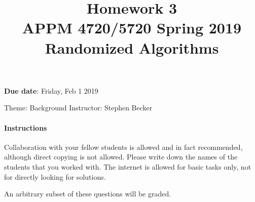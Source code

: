 \documentclass[10pt, letterpaper]{scrartcl}
\title{Homework 3 \solTitle{Selected Solutions} \\APPM 4720/5720 Spring 2019 \\ Randomized Algorithms}
\date{}
\newenvironment{instructions}{}{}
\begin{document}
\maketitle
\vspace{-6em}
\textbf{Due date}: Friday, Feb 1 2019

Theme: Background   \hfill Instructor: Stephen Becker %

\begin{instructions}
\paragraph{Instructions}
Collaboration with your fellow students is allowed and in fact recommended, although direct copying is not allowed.  Please write down the names of the students that you worked with. The internet is allowed for basic tasks only, not for directly looking for solutions.

An arbitrary subset of these questions will be graded.

%
%
\end{instructions}
\end{document}
